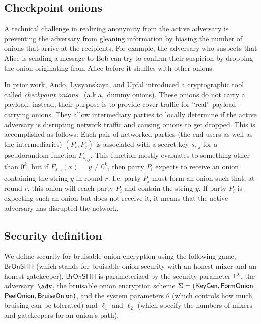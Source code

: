 \documentclass[runningheads,a4paper]{llncs}
\begin{document}
\subsection{Checkpoint onions}
A technical challenge in realizing anonymity from the active adversary is preventing the adversary from gleaning information by biasing the number of onions that arrive at the recipients. For example, the adversary who suspects that Alice is sending a message to Bob can try to confirm their suspicion by dropping the onion originating from Alice before it shuffles with other onions. 

In prior work, Ando, Lysyanskaya, and Upfal introduced a cryptographic tool called \emph{checkpoint onions}~\cite{ICALP:AndLysUpf18} (a.k.a.\ dummy onions). These onions do not carry a payload; instead, their purpose is to provide cover traffic for ``real'' payload-carrying onions. They allow intermediary parties to locally determine if the active adversary is disrupting network traffic and causing onions to get dropped. This is accomplished as follows: Each pair of networked parties (the end-users as well as the intermediaries) $(P_i,P_j)$ is associated with a secret key $s_{i,j}$ for a pseudorandom function $F_{s_{i,j}}$. This function mostly evaluates to something other than $0^k$, but if $F_{s_{i,j}}(x)=y \neq 0^k$, then party $P_i$ expects to receive an onion containing the string $y$ in round $r$. I.e. party $P_j$ must form an onion such that, at round $r$, this onion will reach party $P_i$ and contain the string $y$. If party $P_i$ is expecting such an onion but does not receive it, it means that the active adversary has disrupted the network. 

\newcommand{\partiesgen}{\mathsf{PartiesGen}}



\subsection{Security definition}
We define security for bruisable onion encryption using the following game, $\mathsf{BrOnSHH}$ (which stands for bruisable onion security with an honest mixer and an honest gatekeeper).  
$\mathsf{BrOnSHH}$ is parameterized by 
the security parameter $1^\lambda$, 
the adversary~$\adv$, 
the bruisable onion encryption scheme $\Sigma = (\mathsf{KeyGen}, \mathsf{FormOnion}$, $\mathsf{PeelOnion}, \mathsf{BruiseOnion})$, and 
the system parameters $\theta$ (which controls how much bruising can be tolerated) and $\ell_1$ and $\ell_2$ (which specify the numbers of mixers and gatekeepers for an onion's path).
\end{document}

